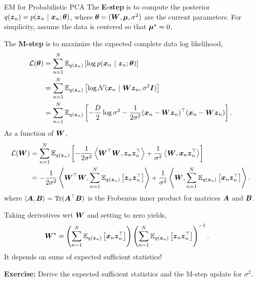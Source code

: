 \documentclass[aspectratio=169]{beamer}
\begin{document}
    

\begin{frame}[t, allowframebreaks]{EM for Probabilistic PCA}
    The \textbf{E-step} is to compute the posterior $q(\boldsymbol{z}_n) = p(\boldsymbol{z}_n ~\vert~ \boldsymbol{x}_n; \boldsymbol{\theta})$, where $\boldsymbol{\theta} = (\boldsymbol{W}, \boldsymbol{\mu}, \sigma^2)$ are the current parameters. For simplicity, assume the data is centered so that $\boldsymbol{\mu}^\star = 0$. 
    
    The \textbf{M-step} is to maximize the expected complete data log likelihood,
    \begin{align*}
        \mathcal{L}(\boldsymbol{\theta}) 
        &= \sum_{n=1}^N \mathbb{E}_{q(\boldsymbol{z}_n)} \left[ \log p(\boldsymbol{x}_n ~\vert~ \boldsymbol{z}_n; \boldsymbol{\theta})\right] \\
        &= \sum_{n=1}^N \mathbb{E}_{q(\boldsymbol{z}_n)} \left[ \log \mathcal{N}(\boldsymbol{x}_n ~\vert~ \boldsymbol{W} \boldsymbol{z}_n, \sigma^2 \boldsymbol{I}) \right] \\
        &= \sum_{n=1}^N \mathbb{E}_{q(\boldsymbol{z}_n)} \left[ -\frac{D}{2} \log \sigma^2 -\frac{1}{2\sigma^2} (\boldsymbol{x}_n - \boldsymbol{W} \boldsymbol{z}_n)^\top (\boldsymbol{x}_n - \boldsymbol{W} \boldsymbol{z}_n)\right].
    \end{align*}
    As a function of $\boldsymbol{W}$, 
    \begin{align*}
        \mathcal{L}(\boldsymbol{W}) 
        &= \sum_{n=1}^N \mathbb{E}_{q(\boldsymbol{z}_n)} \left[ -\frac{1}{2\sigma^2} \left \langle \boldsymbol{W}^\top \boldsymbol{W}, \boldsymbol{z}_n \boldsymbol{z}_n^\top \right \rangle + \frac{1}{\sigma^2} \left \langle \boldsymbol{W}, \boldsymbol{x}_n \boldsymbol{z}_n^\top \right \rangle \right] \\
        &= -\frac{1}{2\sigma^2} \left \langle \boldsymbol{W}^\top \boldsymbol{W}, \sum_{n=1}^N \mathbb{E}_{q(\boldsymbol{z}_n)} \left[ \boldsymbol{z}_n \boldsymbol{z}_n^\top \right] \right \rangle + \frac{1}{\sigma^2} \left \langle \boldsymbol{W}, \sum_{n=1}^N \mathbb{E}_{q(\boldsymbol{z}_n)} \left[ \boldsymbol{x}_n \boldsymbol{z}_n^\top \right] \right \rangle.
    \end{align*}
    where $\langle \boldsymbol{A}, \boldsymbol{B} \rangle = \textrm{Tr}(\boldsymbol{A}^\top \boldsymbol{B})$ is the Frobenius inner product for matrices $\boldsymbol{A}$ and $\boldsymbol{B}$.

    Taking derivatives wrt $\boldsymbol{W}$ and setting to zero yields,
    \begin{align*}
        \boldsymbol{W}^\star &= \left( \sum_{n=1}^N \mathbb{E}_{q(\boldsymbol{z}_n)} \left[ \boldsymbol{x}_n \boldsymbol{z}_n^\top \right] \right) \left( \sum_{n=1}^N \mathbb{E}_{q(\boldsymbol{z}_n)} \left[ \boldsymbol{z}_n \boldsymbol{z}_n^\top \right] \right)^{-1}.
    \end{align*}
    It depends on sums of expected sufficient statistics! 

    \textbf{Exercise:} Derive the expected sufficient statistics and the M-step update for $\sigma^2$.
\end{frame}
\end{document}
